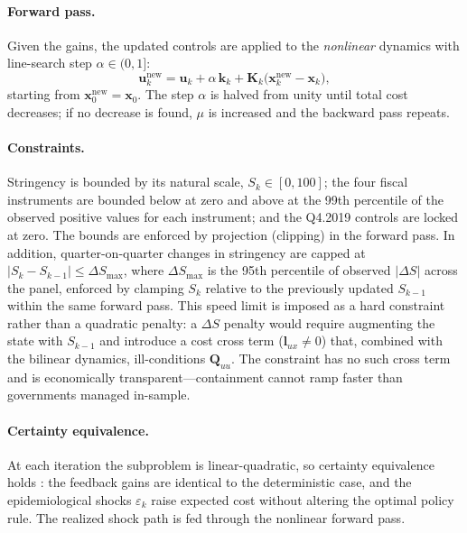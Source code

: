 \documentclass[12pt, a4paper]{article}
\begin{document}
\paragraph{Forward pass.}
Given the gains, the updated controls are applied to the \emph{nonlinear} dynamics
with line-search step $\alpha \in (0,1]$:
%
\begin{equation}
    \bm{u}_k^{\text{new}} = \bm{u}_k + \alpha\,\bm{k}_k
    + \bm{K}_k\bigl(\bm{x}_k^{\text{new}} - \bm{x}_k\bigr),
    \label{eq:fwd}
\end{equation}
%
starting from $\bm{x}_0^{\text{new}} = \bm{x}_0$. The step $\alpha$ is halved from
unity until total cost decreases; if no decrease is found, $\mu$ is increased and
the backward pass repeats.

\paragraph{Constraints.}
Stringency is bounded by its natural scale, $S_k \in [0, 100]$; the four fiscal
instruments are bounded below at zero and above at the 99th percentile of the
observed positive values for each instrument; and the Q4.2019 controls are locked
at zero. The bounds are enforced by projection (clipping) in the forward pass. In
addition, quarter-on-quarter changes in stringency are capped at
$|S_k - S_{k-1}| \le \Delta S_{\max}$, where $\Delta S_{\max}$ is the 95th
percentile of observed $|\Delta S|$ across the panel, enforced by clamping $S_k$
relative to the previously updated $S_{k-1}$ within the same forward pass. This
speed limit is imposed as a hard constraint rather than a quadratic penalty: a
$\Delta S$ penalty would require augmenting the state with $S_{k-1}$ and
introduce a cost cross term ($\bm{l}_{ux} \neq 0$) that, combined with the
bilinear dynamics, ill-conditions $\bm{Q}_{uu}$. The constraint has no such cross
term and is economically transparent---containment cannot ramp faster than
governments managed in-sample.

\paragraph{Certainty equivalence.}
At each iteration the subproblem is linear-quadratic, so certainty equivalence
holds \citep[Chapter~3.1]{bertsekas2017dynamic}: the feedback gains are identical
to the deterministic case, and the epidemiological shocks $\varepsilon_k$ raise
expected cost without altering the optimal policy rule. The realized shock path is
fed through the nonlinear forward pass.
\end{document}
